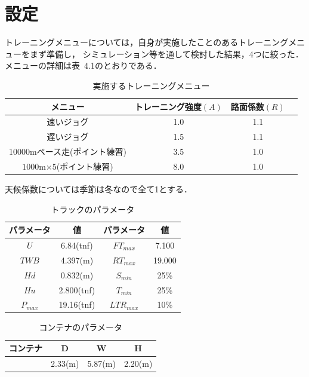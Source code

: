 \documentclass[12pt,fleqn]{jreport}
\begin{document}
\section{設定}
\vspace{1cm}
トレーニングメニューについては，自身が実施したことのあるトレーニングメニューをまず準備し，
シミュレーション等を通して検討した結果，4つに絞った．メニューの詳細は表\ 4.1のとおりである．
\begin{longtable}{|c|c|c|c|}
  \caption{実施するトレーニングメニュー}                                   \\
  \hline
  メニュー                         & トレーニング強度$(A)$ & 路面係数$(R)$ \\
  \hline
  速いジョグ                       & 1.0                   & 1.1           \\
  \hline
  遅いジョグ                       & 1.5                   & 1.1           \\
  \hline
  10000mペース走(ポイント練習)     & 3.5                   & 1.0           \\
  \hline
  $1000$m$ \times 5$(ポイント練習) & 8.0                   & 1.0           \\
  \hline
\end{longtable}
天候係数については季節は冬なので全て1とする．


\begin{table}[htp]
  \caption{トラックのパラメータ}
  \begin{center}
    \begin{tabular}{|c|c|c|c|}
      \hline
      パラメータ & 値         & パラメータ  & 値     \\
      \hline
      $U$        & 6.84(tnf)  & $FT_{max}$  & 7.100  \\
      $TWB$      & 4.397(m)   & $RT_{max}$  & 19.000 \\
      $Hd$       & 0.832(m)   & $S_{min}$   & 25\%   \\
      $Hu$       & 2.800(tnf) & $T_{min}$   & 25\%   \\
      $P_{max}$  & 19.16(tnf) & $LTR_{max}$ & 10\%   \\
      \hline
    \end{tabular}
  \end{center}
\end{table}%
\begin{table}[htp]
  \caption{コンテナのパラメータ}
  \begin{center}
    \begin{tabular}{|c|c|c|c|}
      \hline
      コンテナ & D       & W       & H       \\
      \hline
               & 2.33(m) & 5.87(m) & 2.20(m) \\
      \hline
    \end{tabular}
  \end{center}
\end{table}%
\newpage
\end{document}
